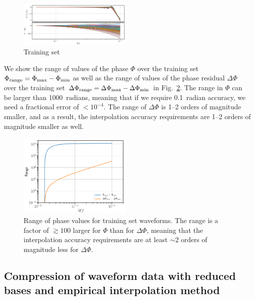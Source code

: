 \documentclass[prd,aps,letter,twocolumn,floatfix,notitlepage,nofootinbib]{revtex4-1}
\begin{document}
\begin{figure}[htb]
\centering
\includegraphics[width=0.49\textwidth]{dh_trainingset.png}
\caption{Training set}
\label{fig:dh}
\end{figure}

We show the range of values of the phase $\Phi$ over the training set $\Phi_{\rm range} = \Phi_{\rm max} - \Phi_{\rm min}$ 
as well as the range of values of the phase residual $\Delta\Phi$ over the training set 
$\Delta\Phi_{\rm range} = \Delta\Phi_{\rm max}-\Delta\Phi_{\rm min}$ in Fig.~\ref{fig:phaserange}. 
The range in $\Phi$ can be larger than 1000~radians, meaning
that if we require 0.1~radian accuracy, we need a fractional error of $<10^{-4}$. The range of $\Delta\Phi$ is 1--2 orders 
of magnitude smaller, and as a result, the interpolation accuracy requirements are 1--2 orders of magnitude smaller as well. 

\begin{figure}[htb]
\centering
\includegraphics[width=0.49\textwidth]{phaserange.png}
\caption{Range of phase values for training set waveforms. The range is a factor of $\gtrsim 100$ larger for $\Phi$ than for $\Delta\Phi$, 
meaning that the interpolation accuracy requirements are at least $\sim 2$ orders of magnitude less for $\Delta\Phi$.}
\label{fig:phaserange}
\end{figure}


\subsection{Compression of waveform data with reduced bases and empirical interpolation method}
\end{document}

